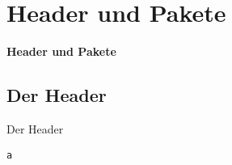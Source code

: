 \documentclass["WS\space 16-17\space -\space LaTeX-Kurs\space -\space Praesentation\space -\space 4.tex"]{subfiles}
\begin{document}
\section{Header und Pakete}
\begin{frame}[c]
	\begin{center}
		\LARGE \textbf{Header und Pakete}
	\end{center}
\end{frame}
\subsection{Der Header}
\begin{frame}[c]
	\begin{center}
		\large Der Header
	\end{center}
\end{frame}
\begin{frame}[fragile]
	\Ausgabe
	\begin{outputbox}
		
	\end{outputbox}

	\pause\Code
	\begin{lstlisting}
a
	\end{lstlisting}
\end{frame}
\end{document}
